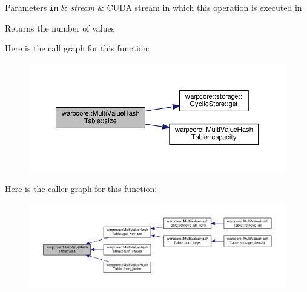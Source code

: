 \begin{DoxyParams}[1]{Parameters}
\mbox{\tt in}  & {\em stream} & C\+U\+DA stream in which this operation is executed in \\
\hline
\end{DoxyParams}
\begin{DoxyReturn}{Returns}
the number of values 
\end{DoxyReturn}
Here is the call graph for this function\+:
\nopagebreak
\begin{figure}[H]
\begin{center}
\leavevmode
\includegraphics[width=350pt]{classwarpcore_1_1MultiValueHashTable_a1be160768bafcae409e3a37ee2829d9f_cgraph}
\end{center}
\end{figure}
Here is the caller graph for this function\+:
\nopagebreak
\begin{figure}[H]
\begin{center}
\leavevmode
\includegraphics[width=350pt]{classwarpcore_1_1MultiValueHashTable_a1be160768bafcae409e3a37ee2829d9f_icgraph}
\end{center}
\end{figure}
\mbox{\label{classwarpcore_1_1MultiValueHashTable_a7f8d4c186530fe60ead1e52f9629622c}} 
